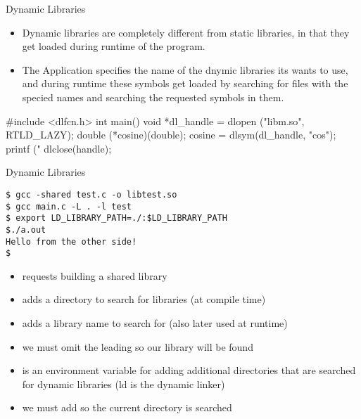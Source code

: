 \documentclass[10pt,graphics,aspectratio=169,table]{beamer}
\begin{document}
\begin{frame}[fragile]{Dynamic Libraries}
    \begin{itemize}
        \item Dynamic libraries are completely different from static libraries,
            in that they get loaded during runtime of the program.
        \item The Application specifies the name of the dnymic libraries 
            its wants to use, and during runtime these symbols get loaded by searching
            for files with the specied names and searching the requested symbols in them.  
    \end{itemize}
    \bigskip
    \begin{codeblock}
#include <dlfcn.h>
int main(){ 
    void *dl_handle = dlopen ("libm.so", RTLD_LAZY);
    double (*cosine)(double);
    cosine = dlsym(dl_handle, "cos");
    printf ("%
    dlclose(handle);
}
    \end{codeblock}
\end{frame}

\begin{frame}[fragile]{Dynamic Libraries}
    \begin{lstlisting}
$ gcc -shared test.c -o libtest.so 
$ gcc main.c -L . -l test
$ export LD_LIBRARY_PATH=./:$LD_LIBRARY_PATH
$./a.out
Hello from the other side!
$
    \end{lstlisting}
    \begin{itemize}
        \item {} requests building a shared library
        \item {} adds a directory to search for libraries (at compile time)
        \item {} adds a library name to search for (also later used at runtime)
        \item we must omit the leading  so our library will be found
        \item {} is an environment variable for adding
            additional directories that are searched for dynamic libraries
            (ld is the dynamic linker)
        \item we must add  so the current directory is searched
    \end{itemize}
\end{frame}
\end{document}
